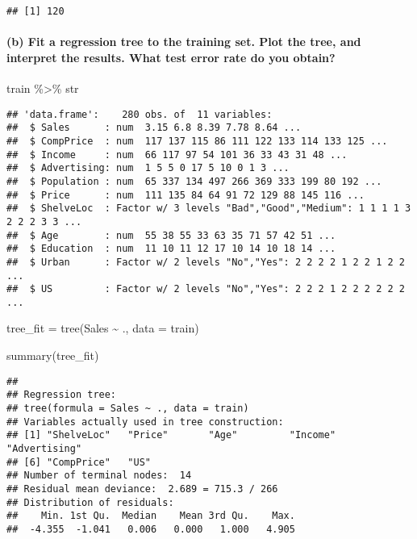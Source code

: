 \documentclass[
]{article}
\newenvironment{Shaded}{\begin{snugshade}}{\end{snugshade}}
\newcommand{\AttributeTok}[1]{\textcolor[rgb]{0.77,0.63,0.00}{#1}}
\newcommand{\FunctionTok}[1]{\textcolor[rgb]{0.00,0.00,0.00}{#1}}
\newcommand{\NormalTok}[1]{#1}
\newcommand{\OtherTok}[1]{\textcolor[rgb]{0.56,0.35,0.01}{#1}}
\newcommand{\SpecialCharTok}[1]{\textcolor[rgb]{0.00,0.00,0.00}{#1}}
\begin{document}
\begin{verbatim}
## [1] 120
\end{verbatim}

\hypertarget{b-fit-a-regression-tree-to-the-training-set.-plot-the-tree-and-interpret-the-results.-what-test-error-rate-do-you-obtain}{%
\paragraph{(b) Fit a regression tree to the training set. Plot the tree,
and interpret the results. What test error rate do you
obtain?}\label{b-fit-a-regression-tree-to-the-training-set.-plot-the-tree-and-interpret-the-results.-what-test-error-rate-do-you-obtain}}

\begin{Shaded}
\begin{Highlighting}[]
\NormalTok{train }\SpecialCharTok{\%\textgreater{}\%}\NormalTok{ str}
\end{Highlighting}
\end{Shaded}

\begin{verbatim}
## 'data.frame':    280 obs. of  11 variables:
##  $ Sales      : num  3.15 6.8 8.39 7.78 8.64 ...
##  $ CompPrice  : num  117 137 115 86 111 122 133 114 133 125 ...
##  $ Income     : num  66 117 97 54 101 36 33 43 31 48 ...
##  $ Advertising: num  1 5 5 0 17 5 10 0 1 3 ...
##  $ Population : num  65 337 134 497 266 369 333 199 80 192 ...
##  $ Price      : num  111 135 84 64 91 72 129 88 145 116 ...
##  $ ShelveLoc  : Factor w/ 3 levels "Bad","Good","Medium": 1 1 1 1 3 2 2 2 3 3 ...
##  $ Age        : num  55 38 55 33 63 35 71 57 42 51 ...
##  $ Education  : num  11 10 11 12 17 10 14 10 18 14 ...
##  $ Urban      : Factor w/ 2 levels "No","Yes": 2 2 2 2 1 2 2 1 2 2 ...
##  $ US         : Factor w/ 2 levels "No","Yes": 2 2 2 1 2 2 2 2 2 2 ...
\end{verbatim}

\begin{Shaded}
\begin{Highlighting}[]
\NormalTok{tree\_fit }\OtherTok{=} \FunctionTok{tree}\NormalTok{(Sales }\SpecialCharTok{\textasciitilde{}}\NormalTok{ ., }\AttributeTok{data =}\NormalTok{ train)}

\FunctionTok{summary}\NormalTok{(tree\_fit)}
\end{Highlighting}
\end{Shaded}

\begin{verbatim}
## 
## Regression tree:
## tree(formula = Sales ~ ., data = train)
## Variables actually used in tree construction:
## [1] "ShelveLoc"   "Price"       "Age"         "Income"      "Advertising"
## [6] "CompPrice"   "US"         
## Number of terminal nodes:  14 
## Residual mean deviance:  2.689 = 715.3 / 266 
## Distribution of residuals:
##    Min. 1st Qu.  Median    Mean 3rd Qu.    Max. 
##  -4.355  -1.041   0.006   0.000   1.000   4.905
\end{verbatim}
\end{document}

